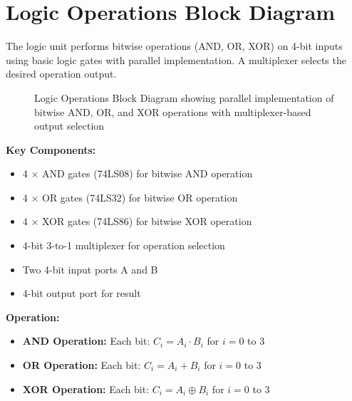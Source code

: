 \section{Logic Operations Block Diagram}

The logic unit performs bitwise operations (AND, OR, XOR) on 4-bit inputs using basic logic gates with parallel implementation. A multiplexer selects the desired operation output.

\begin{figure}[h]
    \centering
    \caption{Logic Operations Block Diagram showing parallel implementation of bitwise AND, OR, and XOR operations with multiplexer-based output selection}
    \label{fig:logic-operations}
\end{figure}

\textbf{Key Components:}
\begin{itemize}
    \item 4 × AND gates (74LS08) for bitwise AND operation
    \item 4 × OR gates (74LS32) for bitwise OR operation
    \item 4 × XOR gates (74LS86) for bitwise XOR operation
    \item 4-bit 3-to-1 multiplexer for operation selection
    \item Two 4-bit input ports A and B
    \item 4-bit output port for result
\end{itemize}

\textbf{Operation:}
\begin{itemize}
    \item \textbf{AND Operation:} Each bit: $C_i = A_i \cdot B_i$ for $i = 0$ to $3$
    \item \textbf{OR Operation:} Each bit: $C_i = A_i + B_i$ for $i = 0$ to $3$
    \item \textbf{XOR Operation:} Each bit: $C_i = A_i \oplus B_i$ for $i = 0$ to $3$
\end{itemize}

